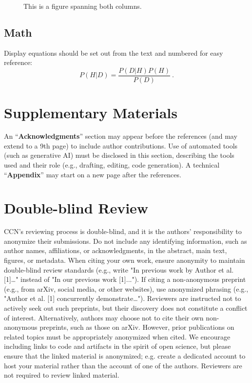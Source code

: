 \documentclass{ccn}  %
\begin{document}
\begin{figure}[ht]
  \begin{center}
    \fbox{\rule[-.5cm]{0cm}{4cm} \rule[-.5cm]{12cm}{0cm}}
  \end{center}
  \caption{This is a figure spanning both columns.}
  \label{sample-figure-wide}
\end{figure}

\subsection{Math}

Display equations should be set out from the text and numbered for easy reference:
\begin{equation}
  P(H|D) = \frac{P(D|H)P(H)}{P(D)}~.
\end{equation}

\section{Supplementary Materials}

An ``{\bf Acknowledgments}'' section may appear before the references (and may extend
to a 9th page) to include author contributions.
Use of automated tools (such as generative AI) must be disclosed in this section,
describing the tools used and their role (e.g., drafting, editing, code generation).
A technical ``{\bf Appendix}'' may start on a new page after the references.

\section{Double-blind Review}

CCN's reviewing process is double-blind, and it is the authors' responsibility to
anonymize their submissions.
Do not include any identifying information, such as author names, affiliations, or
acknowledgments, in the abstract, main text, figures, or metadata.
When citing your own work, ensure anonymity to maintain double-blind review standards
(e.g., write "In previous work by Author et al.
  [1]…" instead of "In our previous work [1]...").
If citing a non-anonymous preprint (e.g., from arXiv, social media, or other websites),
use anonymized phrasing (e.g., "Author et al.
  [1] concurrently demonstrate…").
Reviewers are instructed not to actively seek out such preprints, but their discovery
does not constitute a conflict of interest.
Alternatively, authors may choose not to cite their own non-anonymous preprints, such
as those on arXiv.
However, prior publications on related topics must be appropriately anonymized when
cited.
We encourage including links to code and artifacts in the spirit of open science, but
please ensure that the linked material is anonymized; e.g. create a dedicated account
to host your material rather than the account of one of the authors.
Reviewers are not required to review linked material.
\end{document}
